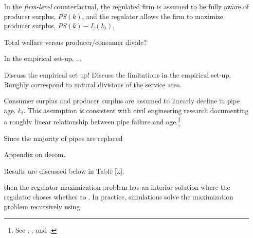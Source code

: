 \documentclass[12pt,table]{article}
\begin{document}
In the \textit{firm-level} counterfactual, the regulated firm is assumed to be fully aware of producer surplus, $PS(k)$, and the regulator allows the firm to maximize producer surplus, $PS(k) - L(k_{t})$.

Total welfare versus producer/consumer divide?



In the empirical set-up, ...


Discuss the empirical set up!  Discuss the limitations in the empirical set-up. Roughly correspond to natural divisions of the service area.

Consumer surplus and producer surplus are assumed to linearly decline in pipe age, $k_t$.  This assumption is consistent with civil engineering research documenting a roughly linear relationship between pipe failure and age.\footnote{See \cite{ward2017deterioration}, \cite{kleiner2001comprehensive}, and \cite{aydogdu2015estimation}.}  

Since the majority of pipes are replaced 

Appendix on decom.




Results are discussed below in Table [x].

 then the regulator maximization problem has an interior solution where the regulator choses whether to .  In practice, simulations solve the maximization problem recursively using 


\end{document}
